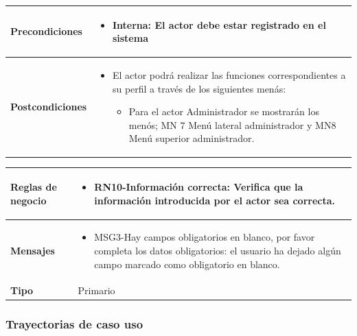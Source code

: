 \begin{center}
\begin{tabular}{| p{3.5cm} | p{11.5cm} |}
   \\ \hline	
       \textbf{Precondiciones  }& 
    \begin{itemize}
    	\item \textbf{Interna: } El actor debe estar registrado en el sistema
    \end{itemize}
   \\ \hline	
    \textbf{Postcondiciones  }& 
    \begin{itemize}
    	\item El actor podrá realizar las funciones correspondientes a su perfil a través de los siguientes menás: 
    		\begin{itemize}
    			\item Para el actor Administrador se mostrarán los menós; MN 7 Menú lateral administrador y MN8 Menú superior administrador.
    		\end{itemize}
    \end{itemize}
   \\ \hline	
         \end{tabular}
   \newpage
      \begin{tabular}{| p{3.5cm} | p{11.5cm} |}   
   \hline    
    \textbf{Reglas de negocio }& 
    \begin{itemize}
    	\item RN10-Información correcta: Verifica que la información introducida por el actor sea correcta.
    \end{itemize}
   \\ \hline	
       \textbf{Mensajes }& 
 	\begin{itemize}
    \item MSG3-Hay campos obligatorios en blanco, por favor completa los datos obligatorios: el usuario ha dejado algún campo marcado como obligatorio en blanco.
	\end{itemize}
   \\ \hline	   
    \textbf{Tipo }& 
    Primario 
   \\ \hline	    
\end{tabular}
 \end{center}
	\newpage
\subsubsection{Trayectorias de caso uso}
	
